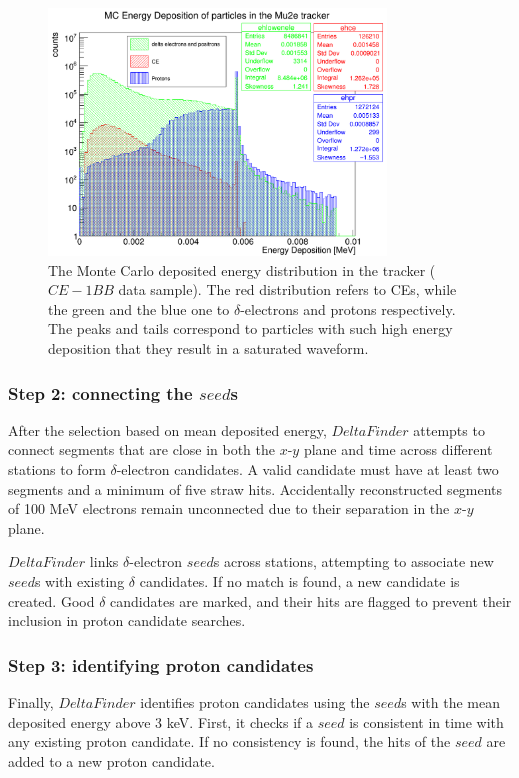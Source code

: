 \begin{figure}[!h]
    \centering
    \includegraphics[width =0.8\textwidth]{figures/png/Screenshot_20240729_151910.png}
\caption[Monte Carlo deposited energy 
distribution in the tracker.]{
   The Monte Carlo deposited energy 
   distribution in the tracker ($CE-1BB$ data sample).  
   The red distribution refers to 
   CEs, while the 
   green and the blue one to $\delta$-electrons 
   and protons respectively. 
   The peaks and tails correspond to 
   particles with such high energy 
   deposition that they result in a 
   saturated waveform.
}
   \label{fig:energydeposited}
\end{figure}
\subsubsection{Step 2: connecting the $seed$s}
After the selection based on mean deposited energy, 
$DeltaFinder$ attempts to connect segments that 
are close in both the $x$-$y$ plane and time 
across different stations to form $\delta$-electron 
candidates. A valid candidate must have at 
least two segments and a minimum of five straw hits. 
Accidentally reconstructed segments of 100 MeV electrons  
remain unconnected due 
to their separation in the $x$-$y$ plane. 

$DeltaFinder$ links $\delta$-electron $seed$s 
across stations, attempting to associate new $seed$s 
with existing $\delta$ candidates. If no match is 
found, a new candidate is created. Good $\delta$ 
candidates are marked, and their hits are 
flagged to prevent their inclusion in proton candidate searches.

\subsubsection{Step 3: identifying proton candidates}
Finally, $DeltaFinder$ identifies proton candidates 
using the $seed$s with the mean deposited energy above 3 keV. First, it checks 
if a $seed$ is consistent in time with any existing 
proton candidate. If no consistency is found, 
the hits of the $seed$ are added to a new proton candidate.


